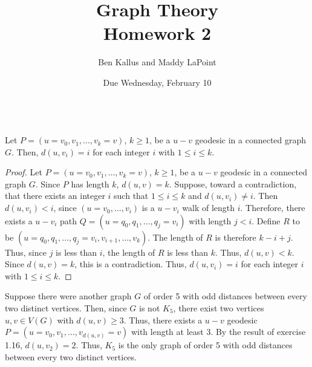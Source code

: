\documentclass[12pt]{article}
\title{Graph Theory \\ Homework 2}
\author{Ben Kallus and Maddy LaPoint}
\date{Due Wednesday, February 10}
\begin{document}
\pagecolor{black}
\color{white}
\maketitle

\\

 Let $P = (u=v_0,v_1,...,v_k=v)$, $k\geq 1$, be a $u - v$ geodesic in a connected graph $G$. Then, $d(u,v_i) = i$ for each integer $i$ with $1 \leq i \leq k$.
\begin{proof}
    Let $P = (u = v_0, v_1, \hdots, v_k = v)$, $k \geq 1$, be a $u-v$ geodesic in a connected graph $G$.
    Since $P$ has length $k$, $d(u,v)=k$.
    Suppose, toward a contradiction, that there exists an integer $i$ such that $1 \leq i \leq k$ and $d(u,v_i) \neq i$.
    Then $d(u,v_i) < i$, since $(u = v_0, \hdots, v_i)$ is a $u-v_i$ walk of length $i$.
    Therefore, there exists a $u-v_i$ path $Q = (u=q_0, q_1, \hdots, q_j=v_i)$ with length $j < i$.
    Define $R$ to be $(u=q_0, q_1, \hdots, q_j=v_i, v_{i+1}, \hdots, v_k)$.
    The length of $R$ is therefore $k - i + j$.
    Thus, since $j$ is less than $i$, the length of $R$ is less than $k$.
    Thus, $d(u,v) < k$. Since $d(u,v) = k$, this is a contradiction.
    Thus, $d(u,v_i)=i$ for each integer $i$ with $1 \leq i \leq k$.
\end{proof}

\bigskip
{}
\begin{center}
\end{center}

    Suppose there were another graph $G$ of order 5 with odd distances between every two distinct vertices.
    Then, since $G$ is not $K_5$, there exist two vertices $u,v \in V(G)$ with $d(u,v) \geq 3$.
    Thus, there exists a $u-v$ geodesic $P = (u=v_0, v_1, \hdots, v_{d(u,v)}=v)$ with length at least 3.
    By the result of exercise 1.16, $d(u,v_2) = 2$.
    Thus, $K_5$ is the only graph of order 5 with odd distances between every two distinct vertices.
\end{document}
